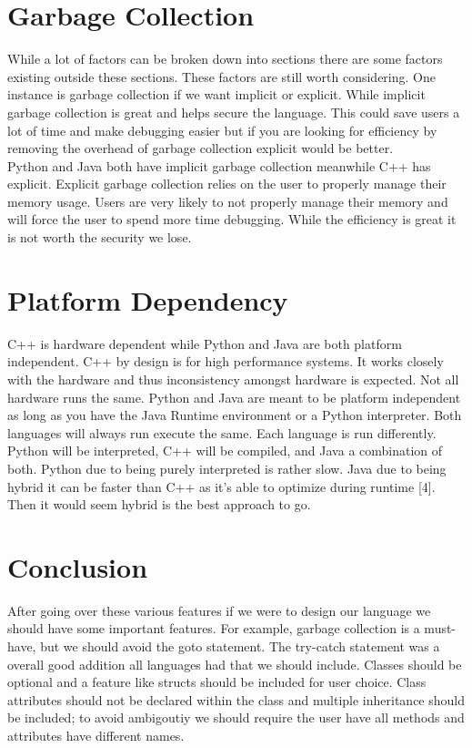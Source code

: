 \documentclass[sigconf, nonacm, authorversion, language=english, 12pt]{acmart}
\def\tab{\hspace*{5mm}}
\begin{document}
\section{Garbage Collection}

\tab While a lot of factors can be broken down into sections there are some factors existing outside these sections. These
factors are still worth considering. One instance is garbage collection if we want implicit or explicit. While implicit
garbage collection is great and helps secure the language. This could save users a lot of time and make debugging easier
but if you are looking for efficiency by removing the overhead of garbage collection explicit would be better.\\

\tab Python and Java both have implicit garbage collection meanwhile C++ has explicit. Explicit garbage collection relies on
the user to properly manage their memory usage. Users are very likely to not properly manage their memory and will
force the user to spend more time debugging. While the efficiency is great it is not worth the security we lose.\\

\section{Platform Dependency}
\tab C++ is hardware dependent while Python and Java are both platform independent. C++ by design is for high performance systems. It works
closely with the hardware and thus inconsistency amongst hardware is expected. Not all hardware runs the same. Python and Java are meant to be platform independent as long as
you have the Java Runtime environment or a Python interpreter. Both languages will always run execute the same. Each language is run differently. Python will be interpreted, C++ will be
compiled, and Java a combination of both. Python due to being purely interpreted is rather slow. Java due to being hybrid it can be faster than C++ as it's able to optimize during runtime [4].
Then it would seem hybrid is the best approach to go.\\



\section{Conclusion}
After going over these various features if we were to design our language we should have some important features. For example, garbage collection is a must-have, but we should avoid
the goto statement. The try-catch statement was a overall good addition all languages had that we should include. Classes should be optional and a feature like structs should be
included for user choice. Class attributes should not be declared within the class and multiple inheritance should be included; to avoid ambigoutiy we should require the user have
all methods and attributes have different names.
\end{document}
